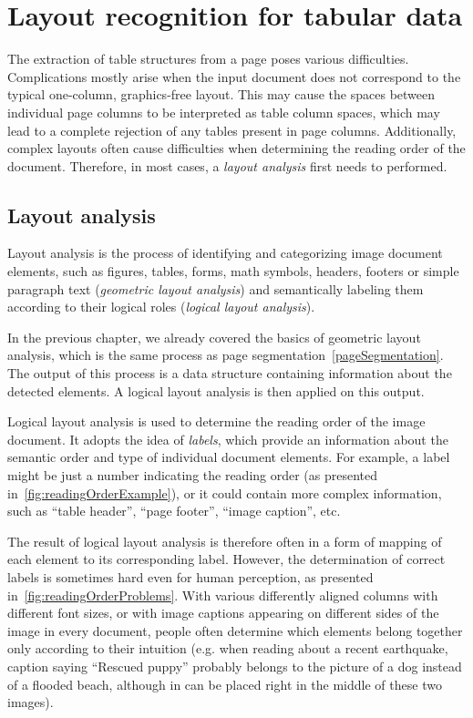 \chapter{Layout recognition for tabular data}

The extraction of table structures from a page poses various difficulties. Complications mostly arise when the input document does not correspond to the typical one-column, graphics-free layout. This may cause the spaces between individual page columns to be interpreted as table column spaces, which may lead to a complete rejection of any tables present in page columns. Additionally, complex layouts often cause difficulties when determining the reading order of the document. Therefore, in most cases, a \emph{layout analysis} first needs to performed.

\section{Layout analysis}

Layout analysis is the process of identifying and categorizing image document elements, such as figures, tables, forms, math symbols, headers, footers or simple paragraph text (\emph{geometric layout analysis}) and semantically labeling them according to their logical roles (\emph{logical layout analysis}).

In the previous chapter, we already covered the basics of geometric layout analysis, which is the same process as page segmentation~\cref{pageSegmentation}. The output of this process is a data structure containing information about the detected elements. A logical layout analysis is then applied on this output.

Logical layout analysis is used to determine the reading order of the image document. It adopts the idea of \emph{labels}, which provide an information about the semantic order and type of individual document elements. For example, a label might be just a number indicating the reading order (as presented in~\cref{fig:readingOrderExample}), or it could contain more complex information, such as ``table header'', ``page footer'', ``image caption'', etc.

The result of logical layout analysis is therefore often in a form of mapping of each element to its corresponding label. However, the determination of correct labels is sometimes hard even for human perception, as presented in~\cref{fig:readingOrderProblems}. With various differently aligned columns with different font sizes, or with image captions appearing on different sides of the image in every document, people often determine which elements belong together only according to their intuition (e.g. when reading about a recent earthquake, caption saying “Rescued puppy” probably belongs to the picture of a dog instead of a flooded beach, although in can be placed right in the middle of these two images).

